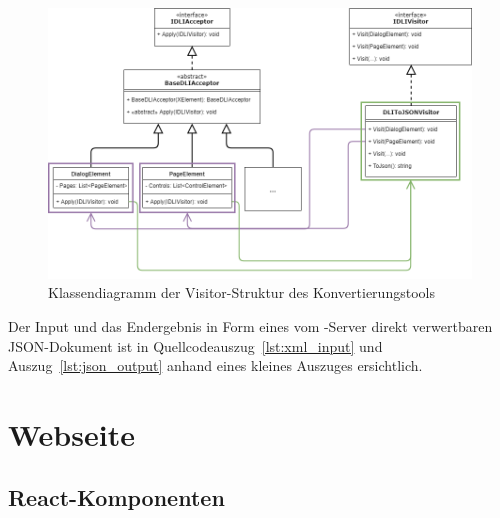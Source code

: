 \begin{figure}
    \centering
    \captionsetup{justification=centering}
    \includegraphics[width=\textwidth]{figures/web-converter_class-diagramm.png}
        \caption{Klassendiagramm der Visitor-Struktur des Konvertierungstools}\label{fig:web-conv_class-diagramm}
\end{figure}

Der Input und das Endergebnis in Form eines vom -Server direkt verwertbaren JSON-Dokument ist in Quellcodeauszug~\ref{lst:xml_input} und Auszug~\ref{lst:json_output} anhand eines kleines Auszuges ersichtlich.




\section{Webseite}

\subsection{React-Komponenten}

